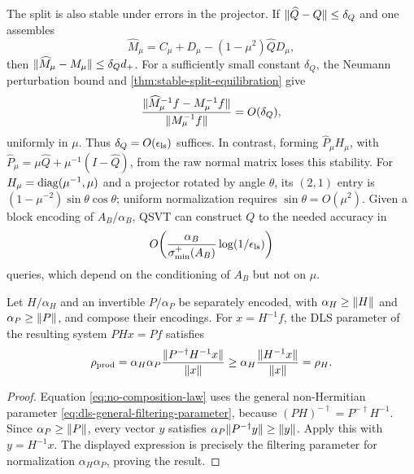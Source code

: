 The split is also stable under errors in the projector.  If
$\lVert\widehat Q-Q\rVert\leq\delta_Q$ and one assembles
\[
 \widehat M_\mu=C_\mu+D_\mu-(1-\mu^2)\widehat QD_\mu,
\]
then $\lVert\widehat M_\mu-M_\mu\rVert\leq\delta_Qd_+$.  For a sufficiently small
constant $\delta_Q$, the Neumann perturbation bound and
\cref{thm:stable-split-equilibration} give
\begin{equation}
 \frac{\lVert\widehat M_\mu^{-1}f-M_\mu^{-1}f\rVert}
      {\lVert M_\mu^{-1}f\rVert}=O(\delta_Q),
 \label{eq:projector-firewall}
\end{equation}
uniformly in $\mu$.  Thus $\delta_Q=O(\epsilon_{\rm ls})$ suffices.  In
contrast, forming $\widehat P_\mu H_\mu$, with
$\widehat P_\mu=\mu\widehat Q+\mu^{-1}(I-\widehat Q)$, from the raw normal
matrix loses this stability.  For $H_\mu=\operatorname{diag}(\mu^{-1},\mu)$ and a
projector rotated by angle $\theta$, its $(2,1)$ entry is
$(1-\mu^{-2})\sin\theta\cos\theta$; uniform normalization requires
$\sin\theta=O(\mu^2)$.  Given a block encoding of $A_B/\alpha_B$, QSVT can
construct $Q$ to the needed accuracy in
\begin{equation}
 O\!\left(\frac{\alpha_B}{\sigma_{\min}^+(A_B)}
 \log(1/\epsilon_{\rm ls})\right)
 \label{eq:active-projector-cost}
\end{equation}
queries, which depend on the conditioning of $A_B$ but not on $\mu$.

\begin{proposition}
\label{prop:no-composed-preconditioning}
Let $H/\alpha_H$ and an invertible $P/\alpha_P$ be separately encoded, with
$\alpha_H\geq\lVert H\rVert$ and $\alpha_P\geq\lVert P\rVert$, and compose their encodings.
For $x=H^{-1}f$, the DLS parameter of the resulting system
$PHx=Pf$ satisfies
\begin{equation}
 \rho_{\rm prod}
 =\alpha_H\alpha_P
  \frac{\lVert P^{-\dagger}H^{-1}x\rVert}{\lVert x\rVert}
 \geq \alpha_H\frac{\lVert H^{-1}x\rVert}{\lVert x\rVert}
 =\rho_H.
 \label{eq:no-composition-law}
\end{equation}
\end{proposition}

\begin{proof}
Equation \eqref{eq:no-composition-law} uses the general non-Hermitian
parameter \eqref{eq:dls-general-filtering-parameter}, because
$(PH)^{-\dagger}=P^{-\dagger}H^{-1}$.  Since
$\alpha_P\geq\lVert P\rVert$, every
vector $y$ satisfies
$\alpha_P\lVert P^{-\dagger}y\rVert\geq\lVert y\rVert$.  Apply this with
$y=H^{-1}x$.  The displayed expression is precisely the filtering
parameter for normalization $\alpha_H\alpha_P$, proving the result.
\end{proof}

